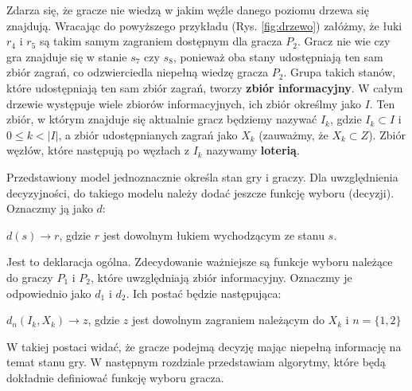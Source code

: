 Zdarza się, że gracze nie wiedzą w jakim węźle danego poziomu drzewa się znajdują. Wracając do powyższego przykładu (Rys. \ref{fig:drzewo}) załóżmy, że łuki $r_4$ i $r_5$ są takim samym zagraniem dostępnym dla gracza $P_2$. Gracz nie wie czy gra znajduje się w stanie $s_7$ czy $s_8$, ponieważ oba stany udostępniają ten sam zbiór zagrań, co odzwierciedla niepełną wiedzę gracza $P_2$. Grupa takich stanów, które udostępniają ten sam zbiór zagrań, tworzy \textbf{zbiór informacyjny}. W całym drzewie występuje wiele zbiorów informacyjnych, ich zbiór określmy jako $I$. Ten zbiór, w którym znajduje się aktualnie gracz będziemy nazywać $I_k$, gdzie $I_k \subset I$ i $0 \leq k < |I|$, a zbiór udostępnianych zagrań jako $X_k$ (zauważmy, że $X_k \subset Z$). Zbiór węzłów, które następują po węzłach z $I_k$ nazywamy \textbf{loterią}.

Przedstawiony model jednoznacznie określa stan gry i graczy. Dla uwzględnienia decyzyjności, do takiego modelu należy dodać jeszcze funkcję wyboru (decyzji). Oznaczmy ją jako $d$:
\begin{center}
	$d(s) \rightarrow r$, gdzie $r$ jest dowolnym łukiem wychodzącym ze stanu $s$.
\end{center}

Jest to deklaracja ogólna. Zdecydowanie ważniejsze są funkcje wyboru należące do graczy $P_1$ i $P_2$, które uwzględniają zbiór informacyjny. Oznaczmy je odpowiednio jako $d_1$ i $d_2$. Ich postać będzie następująca:

\begin{center}
	$d_n(I_k, X_k) \rightarrow z$, gdzie $z$ jest dowolnym zagraniem należącym do $X_k$ i $n = \{1, 2\}$
\end{center}
W takiej postaci widać, że gracze podejmą decyzję mając niepełną informację na temat stanu gry. W następnym rozdziale przedstawiam algorytmy, które będą dokładnie definiować funkcję wyboru gracza.
